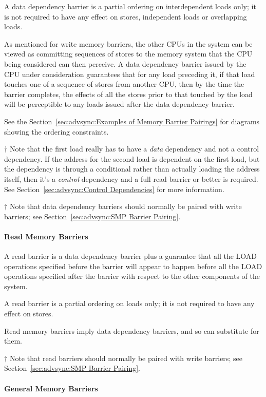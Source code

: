 A data dependency barrier is a partial ordering on interdependent loads
only; it is not required to have any effect on stores, independent loads
or overlapping loads.

As mentioned for write memory barriers,
the other CPUs in the system can be viewed as
committing sequences of stores to the memory system that the CPU being
considered can then perceive.  A data dependency barrier issued by the CPU
under consideration guarantees that for any load preceding it, if that
load touches one of a sequence of stores from another CPU, then by the
time the barrier completes, the effects of all the stores prior to that
touched by the load will be perceptible to any loads issued after the data
dependency barrier.

See the Section~\ref{sec:advsync:Examples of Memory Barrier Pairings} for
diagrams showing the ordering constraints.

$\dagger$ Note that the first load really has to have a
\emph{data} dependency and
not a control dependency.  If the address for the second load is dependent
on the first load, but the dependency is through a conditional rather than
actually loading the address itself, then it's a \emph{control} dependency and
a full read barrier or better is required.  See
Section~\ref{sec:advsync:Control Dependencies} for more information.

$\dagger$ Note that data dependency barriers should normally be paired with
write barriers; see Section~\ref{sec:advsync:SMP Barrier Pairing}.

\paragraph{Read Memory Barriers}

A read barrier is a data dependency barrier plus a guarantee that all the
LOAD operations specified before the barrier will appear to happen before
all the LOAD operations specified after the barrier with respect to the
other components of the system.

A read barrier is a partial ordering on loads only; it is not required to
have any effect on stores.

Read memory barriers imply data dependency barriers, and so can substitute
for them.

$\dagger$ Note that read barriers should normally be paired with write barriers;
see Section~\ref{sec:advsync:SMP Barrier Pairing}.

\paragraph{General Memory Barriers}

